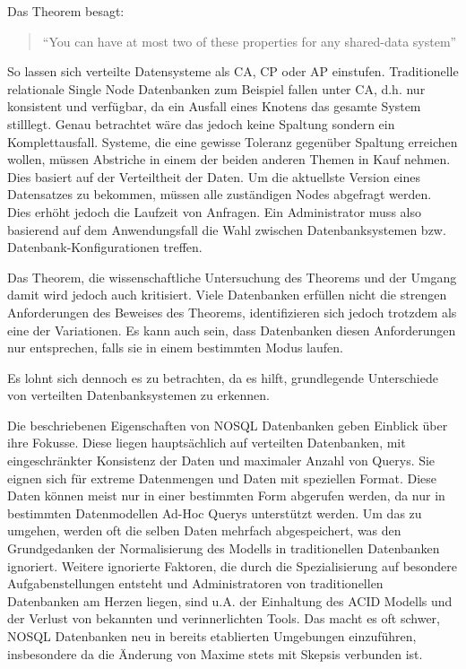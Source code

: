 Das Theorem besagt: 
 
\begin{quote}
"`You can have at most two of these properties for any shared-data system"' \cite[Folie 14]{Brewer.2000}
\end{quote}

So lassen sich verteilte Datensysteme als CA, CP oder AP einstufen. Traditionelle relationale Single Node Datenbanken zum Beispiel fallen unter CA, d.h. nur konsistent und verfügbar, da ein Ausfall eines Knotens das gesamte System stilllegt. Genau betrachtet wäre das jedoch keine Spaltung sondern ein Komplettausfall. Systeme, die eine gewisse Toleranz gegenüber Spaltung erreichen wollen, müssen Abstriche in einem der beiden anderen Themen in Kauf nehmen. Dies basiert auf der Verteiltheit der Daten. Um die aktuellste Version eines Datensatzes zu bekommen, müssen alle zuständigen Nodes abgefragt werden. Dies erhöht jedoch die Laufzeit von Anfragen. Ein Administrator muss also basierend auf dem Anwendungsfall die Wahl zwischen Datenbanksystemen bzw. Datenbank-Konfigurationen treffen.

Das Theorem, die wissenschaftliche Untersuchung des Theorems und der Umgang damit wird jedoch auch kritisiert. Viele Datenbanken erfüllen nicht die strengen Anforderungen des Beweises des Theorems, identifizieren sich jedoch trotzdem als eine der Variationen. Es kann auch sein, dass Datenbanken diesen Anforderungen nur entsprechen, falls sie in einem bestimmten Modus laufen. \cite{MartinKleppmann.2015}

Es lohnt sich dennoch es zu betrachten, da es hilft, grundlegende Unterschiede von verteilten Datenbanksystemen zu erkennen. 



Die beschriebenen Eigenschaften von NOSQL Datenbanken geben Einblick über ihre Fokusse. Diese liegen hauptsächlich auf verteilten Datenbanken, mit eingeschränkter Konsistenz der Daten und maximaler Anzahl von Querys. 
Sie eignen sich für extreme Datenmengen und Daten mit speziellen Format. Diese Daten können meist nur in einer bestimmten Form abgerufen werden, da nur in bestimmten Datenmodellen Ad-Hoc Querys unterstützt werden. Um das zu umgehen, werden oft die selben Daten mehrfach abgespeichert, was den Grundgedanken der Normalisierung des Modells in traditionellen Datenbanken ignoriert.
Weitere ignorierte Faktoren, die durch die Spezialisierung auf besondere Aufgabenstellungen entsteht und Administratoren von traditionellen Datenbanken am Herzen liegen, sind u.A. der Einhaltung des \ac{ACID} Modells und der Verlust von bekannten und verinnerlichten Tools. Das macht es oft schwer, NOSQL Datenbanken neu in bereits etablierten Umgebungen einzuführen, insbesondere da die Änderung von Maxime stets mit Skepsis verbunden ist.


